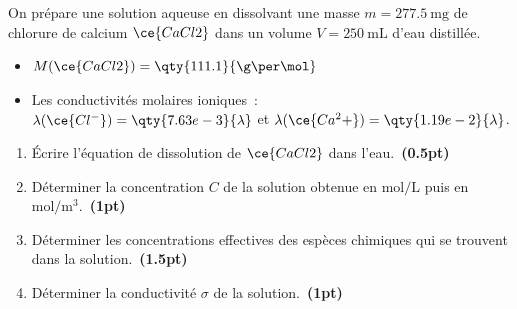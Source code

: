 On prépare une solution aqueuse en dissolvant une masse $m=\qty{277.5}{\mg}$ de
chlorure de calcium $\ce{CaCl2}$ dans un volume $V=\qty{250}{\mL}$ d'eau
distillée.

\begin{donnees}
    \begin{itemize}
        \item $M(\ce{CaCl2})=\qty{111.1}{\g\per\mol}$
        \item Les conductivités molaires ioniques~: \\
              $\lambda(\ce{Cl^-})=\qty{7.63e-3}{\lambda}$ et
              $\lambda(\ce{Ca^2+})=\qty{1.19e-2}{\lambda}$.
    \end{itemize}
\end{donnees}

\begin{enumerate}
    \item Écrire l'équation de dissolution de $\ce{CaCl2}$ dans
          l'eau.~\textbf{(0.5pt)}
    \item Déterminer la concentration $C$ de la solution obtenue en
          $\unit{\mol\per\L}$ puis en $\unit{\mol\per\cubic\m}$.~\textbf{(1pt)}

    \item Déterminer les concentrations effectives des espèces chimiques qui se
          trouvent dans la solution.~\textbf{(1.5pt)}
    \item Déterminer la conductivité $\sigma$ de la solution.~\textbf{(1pt)}
\end{enumerate}
